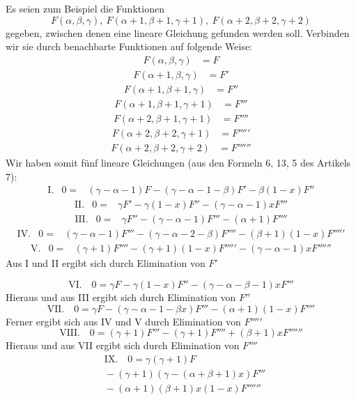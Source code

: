 Es seien zum Beispiel die Funktionen
\[
F(\alpha,\beta,\gamma),\ F(\alpha+1,\beta+1,\gamma+1),\ F(\alpha+2,\beta+2,\gamma+2)
\]
gegeben, zwischen denen eine lineare Gleichung gefunden werden soll. Verbinden wir sie durch benachbarte Funktionen auf folgende Weise:
\[
\begin{array}{rl}
F(\alpha,\beta,\gamma)&=F
\end{array}
\]
\[
\begin{array}{rl}
F(\alpha+1,\beta,\gamma)&=F'
\end{array}
\]
\[
\begin{array}{rl}
F(\alpha+1,\beta+1,\gamma)&=F''
\end{array}
\]
\[
\begin{array}{rl}
F(\alpha+1,\beta+1,\gamma+1)&=F'''
\end{array}
\]
\[
\begin{array}{rl}
F(\alpha+2,\beta+1,\gamma+1)&=F''''
\end{array}
\]
\[
\begin{array}{rl}
F(\alpha+2,\beta+2,\gamma+1)&=F'''''
\end{array}
\]
\[
\begin{array}{rl}
F(\alpha+2,\beta+2,\gamma+2)&=F''''''
\end{array}
\]
Wir haben somit fünf lineare Gleichungen (aus den Formeln 6, 13, 5 des Artikels 7):
\[
\begin{array}{rcl}
\mathrm{I.}&0=&(\gamma-\alpha-1)F-(\gamma-\alpha-1-\beta)F'-\beta(1-x)F''
\end{array}
\]
\[
\begin{array}{rcl}
\mathrm{II.}&0=&\gamma F'-\gamma(1-x)F''-(\gamma-\alpha-1)xF'''
\end{array}
\]
\[
\begin{array}{rcl}
\mathrm{III.}&0=&\gamma F''-(\gamma-\alpha-1)F'''-(\alpha+1)F''''
\end{array}
\]
\[
\begin{array}{rcl}
\mathrm{IV.}&0=&(\gamma-\alpha-1)F'''-(\gamma-\alpha-2-\beta)F''''-(\beta+1)(1-x)F'''''
\end{array}
\]
\[
\begin{array}{rcl}
\mathrm{V.}&0=&(\gamma+1)F''''-(\gamma+1)(1-x)F'''''-(\gamma-\alpha-1)xF''''''
\end{array}
\]
Aus I und II ergibt sich durch Elimination von $F'$

\[
\mathrm{VI.}\quad 0=\gamma F-\gamma(1-x)F''-(\gamma-\alpha-\beta-1)xF'''
\]
Hieraus und aus III ergibt sich durch Elimination von $F''$
\[
\mathrm{VII.}\quad 0=\gamma F-(\gamma-\alpha-1-\beta x)F'''-(\alpha+1)(1-x)F''''
\]
Ferner ergibt sich aus IV und V durch Elimination von $F'''''$
\[
\mathrm{VIII.}\quad 0=(\gamma+1)F'''-(\gamma+1)F''''+(\beta+1)xF''''''
\]
Hieraus und aus VII ergibt sich durch Elimination von $F''''$
\[
\begin{aligned}&\mathrm{IX.}\quad 0=\gamma(\gamma+1)F\\&{}-(\gamma+1)(\gamma-(\alpha+\beta+1)x)F'''\\&{}-(\alpha+1)(\beta+1)x(1-x)F''''''\end{aligned}
\]
